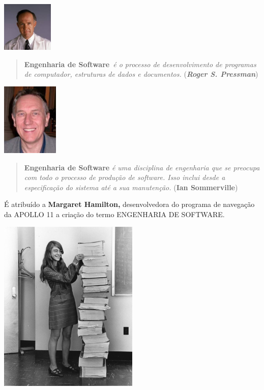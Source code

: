 \documentclass[
]{book}
\begin{document}
\includegraphics[width=0.95833in,height=\textheight]{images/pressman.jpg}

\begin{quote}
\textbf{Engenharia de Software}~\emph{é o processo de desenvolvimento de programas de computador, estruturas de dados e documentos.} (\textbf{\emph{Roger S. Pressman}})
\end{quote}

\includegraphics[width=1.0625in,height=\textheight]{images/sommerville.jpg}

\begin{quote}
\textbf{Engenharia de Software} \emph{é uma disciplina de engenharia que se preocupa com todo o processo de produção de software. Isso inclui desde a especificação do sistema até a sua manutenção.} (\textbf{Ian Sommerville})
\end{quote}

É atribuído a \textbf{Margaret Hamilton,} desenvolvedora do programa de navegação da APOLLO 11 a criação do termo ENGENHARIA DE SOFTWARE.

\includegraphics[width=0.5\textwidth,height=\textheight]{images/Margaret_Hamilton.jpg}
\end{document}

